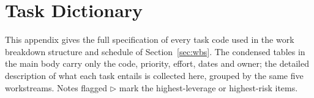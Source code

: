 \section{Task Dictionary}
\label{app:taskdict}

This appendix gives the full specification of every task code used in the work
breakdown structure and schedule of Section~\ref{sec:wbs}. The condensed tables
in the main body carry only the code, priority, effort, dates and owner; the
detailed description of what each task entails is collected here, grouped by the
same five workstreams. Notes flagged \textcolor{p0col}{$\triangleright$} mark the
highest-leverage or highest-risk items.

